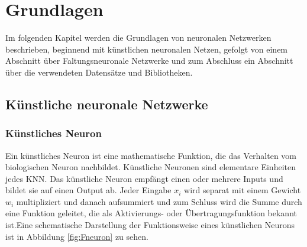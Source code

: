 \documentclass[12pt,a4paper]{scrartcl}
\numberwithin{equation}{section}
\begin{document}
 \newpage  %
 
\section{Grundlagen}\label{Grundlagen}
Im folgenden Kapitel werden die Grundlagen von neuronalen Netzwerken beschrieben, beginnend mit künstlichen neuronalen Netzen, gefolgt von einem Abschnitt über Faltungsneuronale Netzwerke und
zum Abschluss ein Abschnitt über die verwendeten Datensätze und Bibliotheken.
\subsection{Künstliche neuronale Netzwerke}
\subsubsection{Künstliches Neuron}
Ein künstliches Neuron \cite{kneuron} ist eine mathematische Funktion, die das Verhalten vom biologischen Neuron nachbildet. Künstliche Neuronen sind elementare Einheiten jedes \ac{KNN}. Das künstliche Neuron empfängt einen oder mehrere Inputs und bildet sie auf einen Output ab. Jeder Eingabe $ x_i $ wird separat mit einem Gewicht $ w_i $ multipliziert und danach aufsummiert und zum Schluss wird die Summe durch eine Funktion geleitet, die als Aktivierungs- oder Übertragungsfunktion bekannt ist.Eine schematische Darstellung der Funktionsweise eines künstlichen Neurons ist in Abbildung  \ref{fig:Fneuron} zu sehen.
\end{document}
